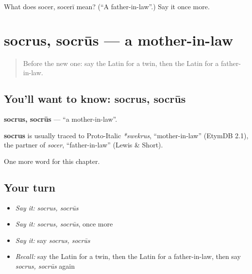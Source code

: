 \begin{tcolorbox}[breakable,colback=teal!4,colframe=teal!35!black,title={Before you move on}]
What does socer, socerī mean? (\textquotedblleft{}A father-in-law\textquotedblright{}.) Say it once more.
\end{tcolorbox}
\section[socrus, socrūs]{socrus, socrūs — a mother-in-law}

\label{lesson:LA-C247-socrus}



\begin{quote}
Before the new one: say the Latin for a twin, then the Latin for a father-in-law.
\end{quote}

\subsection*{You'll want to know: socrus, socrūs}
\textbf{socrus, socrūs} — \textquotedblleft{}a mother-in-law\textquotedblright{}.

\begin{cousinweb}
\textbf{socrus} is usually traced to Proto-Italic \emph{*swekrus}, \textquotedblleft{}mother-in-law\textquotedblright{} (EtymDB 2.1), the partner of \emph{socer}, \textquotedblleft{}father-in-law\textquotedblright{} (Lewis \& Short).
\end{cousinweb}

\begin{grammarlens}[title={What you've built}]
One more word for this chapter.
\end{grammarlens}

\subsection*{Your turn}
\begin{itemize}
\raggedright
  \item \emph{Say it:} \emph{socrus, socrūs}
  \item \emph{Say it:} \emph{socrus, socrūs}, once more
  \item \emph{Say it:} say \emph{socrus, socrūs}
  \item \emph{Recall:} say the Latin for a twin, then the Latin for a father-in-law, then say \emph{socrus, socrūs} again
\end{itemize}

